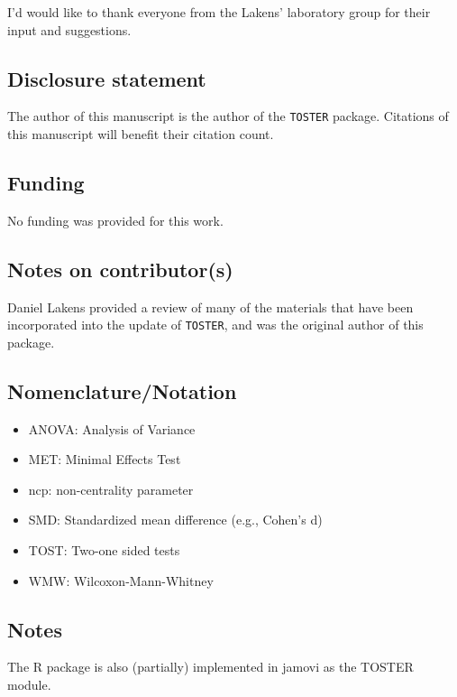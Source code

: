 \documentclass[]{interact}
\theoremstyle{plain}%
\theoremstyle{definition}
\theoremstyle{remark}
\providecommand{\tightlist}{%
  \setlength{\itemsep}{0pt}\setlength{\parskip}{0pt}}
\def\tightlist{}
\begin{document}
I'd would like to thank everyone from the Lakens' laboratory group for
their input and suggestions.

\hypertarget{disclosure-statement}{%
\subsection*{Disclosure statement}\label{disclosure-statement}}

The author of this manuscript is the author of the \texttt{TOSTER}
package. Citations of this manuscript will benefit their citation count.

\hypertarget{funding}{%
\subsection*{Funding}\label{funding}}

No funding was provided for this work.

\hypertarget{notes-on-contributors}{%
\subsection*{Notes on contributor(s)}\label{notes-on-contributors}}

Daniel Lakens provided a review of many of the materials that have been
incorporated into the update of \texttt{TOSTER}, and was the original
author of this package.

\hypertarget{nomenclaturenotation}{%
\subsection*{Nomenclature/Notation}\label{nomenclaturenotation}}

\begin{itemize}
\tightlist
\item
  ANOVA: Analysis of Variance
\item
  MET: Minimal Effects Test
\item
  ncp: non-centrality parameter
\item
  SMD: Standardized mean difference (e.g., Cohen's d)
\item
  TOST: Two-one sided tests
\item
  WMW: Wilcoxon-Mann-Whitney
\end{itemize}

\hypertarget{notes}{%
\subsection*{Notes}\label{notes}}

The R package is also (partially) implemented in jamovi as the TOSTER
module.

\newpage



\end{document}
